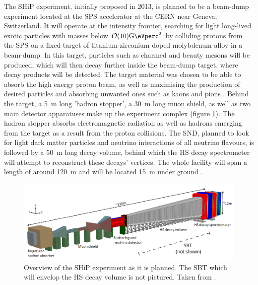 	The \ac{SHiP} experiment, initially proposed in 2013, is planned to be a beam-dump experiment located at the \ac{SPS} accelerator at the \ac{CERN} near Geneva, Switzerland. It will operate at the intensity frontier, searching for  light long-lived exotic particles with masses below $\order{10} \SI[per-mode=symbol]{}{\giga\eVperc\squared}$ \cite{SHIP-proposal} by colliding protons from the \ac{SPS} on a fixed target of titanium-zirconium doped molybdenum alloy in a beam-dump. In this target, particles such as charmed and beauty mesons will be produced, which will then decay further inside the beam-dump target, where decay products will be detected. The target material was chosen to be able to absorb the high energy proton beam, as well as maximising the production of desired particles and absorbing unwanted ones such as kaons and pions  \cite{TARGET}.
	Behind the target, a \SI{5}{\meter} long 'hadron stopper', a \SI{30}{\meter} long muon shield, as well as two main detector apparatuses make up the experiment complex (figure \ref{fig:SHIP-facility}).
	The hadron stopper absorbs electromagnetic radiation as well as hadrons emerging from the target as a result from the proton collisions. The \ac{SND}, planned to look for light dark matter particles and neutrino interactions of all neutrino flavours, is followed by a \SI{50}{\meter} long decay volume, behind which the \ac{HS} decay spectrometer will attempt to reconstruct these decays' vertices. The whole facility will span a length of around \SI{120}{\meter} and will be located \SI{15}{\meter} under ground \cite{SHIP-DESIGN-2019}.
	
	
	\begin{figure}
		\centering
		\includegraphics[width=\textwidth]{pictures/ship-facility.pdf}
		\caption{Overview of the \ac{SHiP} experiment as it is planned. The \ac{SBT} which will envelop the \ac{HS} decay volume is not pictured. Taken from \cite{SHIP-DESIGN-2019}.}
		\label{fig:SHIP-facility}
	\end{figure}


